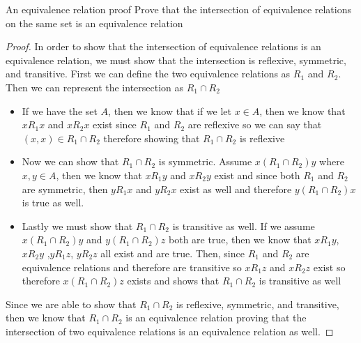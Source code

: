 An equivalence relation proof
Prove that the intersection of equivalence relations on the same set is an equivalence relation

\begin{proof}
In order to show that the intersection of equivalence relations is an equivalence relation, we must show that the intersection is reflexive, symmetric, and transitive. First we can define the two equivalence relations as $R_1$ and $R_2$. Then we can represent the intersection as $R_1\cap R_2$

\begin{itemize}
    \item If we have the set $A$, then we know that if we let $x\in A$, then we know that $xR_1x$ and $xR_2x$ exist since $R_1$ and $R_2$ are reflexive so we can say that $(x,x)\in R_1\cap R_2$ therefore showing that $R_1\cap R_2$ is reflexive
    \item Now we can show that $R_1\cap R_2$ is symmetric. Assume $x(R_1\cap R_2)y$ where $x,y \in A$, then we know that $xR_1y$ and $xR_2y$ exist and since both $R_1$ and $R_2$ are symmetric, then $yR_1x$ and $yR_2x$ exist as well and therefore $y(R_1\cap R_2)x$ is true as well.
    \item Lastly we must show that $R_1\cap R_2$ is transitive as well. If we assume $x(R_1\cap R_2)y$ and $y(R_1\cap R_2)z$ both are true, then we know that $xR_1y$, $xR_2y$ ,$yR_1z$, $yR_2z$ all exist and are true. Then, since $R_1$ and $R_2$ are equivalence relations and therefore are transitive so $xR_1z$ and $xR_2z$ exist so therefore $x(R_1\cap R_2)z$ exists and shows that $R_1\cap R_2$ is transitive as well
\end{itemize}
Since we are able to show that $R_1\cap R_2$ is reflexive, symmetric, and transitive, then we know that $R_1\cap R_2$ is an equivalence relation proving that the intersection of two equivalence relations is an equivalence relation as well.
\end{proof}